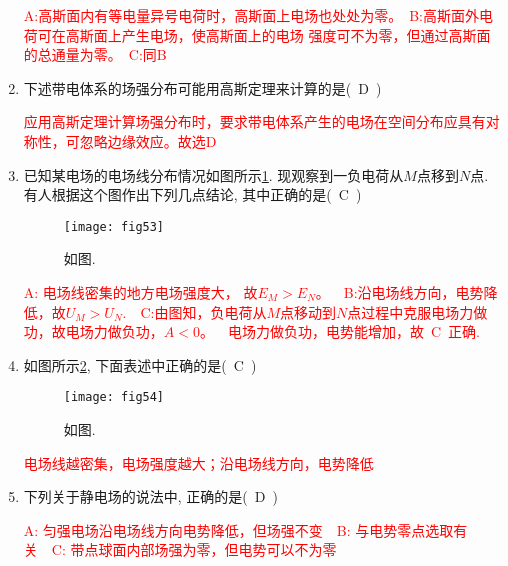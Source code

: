 \begin{enumerate}
    \begin{note}
        \textcolor{red}{A:高斯面内有等电量异号电荷时，高斯面上电场也处处为零。\ B:高斯面外电荷可在高斯面上产生电场，使高斯面上的电场     
        强度可不为零，但通过高斯面的总通量为零。\ C:同B
}
    \end{note}
    \item 下述带电体系的场强分布可能用高斯定理来计算的是(~D~)
    \begin{note}
        \textcolor{red}{应用高斯定理计算场强分布时，要求带电体系产生的电场在空间分布应具有对称性，可忽略边缘效应。故选D
        }
    \end{note}
    \item 已知某电场的电场线分布情况如图所示\ref{Fig:53}. 现观察到一负电荷从$M$点移到$N$点. 有人根据这个图作出下列几点结论, 其中正确的是(~C~)
    \begin{figure}[H]
        \centering
        \texttt{[image: fig53]}
        \caption{如图.}\label{Fig:53}
    \end{figure}
    \begin{note}
        \textcolor{red}{A: 电场线密集的地方电场强度大， 故$E_M>E_N$。\ \ B:沿电场线方向，电势降低，故$U_M>U_N$.\ \ C:由图知，负电荷从$M$点移动到$N$点过程中克服电场力做     
        功，故电场力做负功，$A<0$。\ \ 电场力做负功，电势能增加，故~C~正确.
        }
    \end{note}
    \item 如图所示\ref{Fig:54}, 下面表述中正确的是(~C~)
    \begin{figure}[H]
        \centering
        \texttt{[image: fig54]}
        \caption{如图.}\label{Fig:54}
    \end{figure}
    \begin{note}
        \textcolor{red}{电场线越密集，电场强度越大；沿电场线方向，电势降低
        }
    \end{note}
    \item 下列关于静电场的说法中, 正确的是(~D~)
    \begin{note}
        \textcolor{red}{A: 匀强电场沿电场线方向电势降低，但场强不变\ \ B: 与电势零点选取有关\ \ C: 带点球面内部场强为零，但电势可以不为零}
    \end{note}
\end{enumerate}
